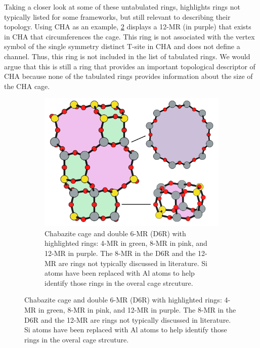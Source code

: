 \documentclass[preprint,numrefs,noinfo,sort&compress]{elsarticle}
\begin{document}
Taking a closer look at some of these untabulated rings, highlights rings not typically listed for some frameworks, but still relevant to describing their topology. Using CHA as an example, \cref{fig:cha-rings} displays a 12-MR (in purple) that exists in CHA that circumferences the cage. This ring is not associated with the vertex symbol of the single symmetry distinct T-site in CHA and does not define a channel. Thus, this ring is not included in the list of tabulated rings. We would argue that this is still a ring that provides an important topological descriptor of CHA because none of the tabulated rings provides information about the size of the CHA cage. 

\begin{figure}
\begin{figure}[H]
\centering
\includegraphics[width=\textwidth]{figures/chapter-3/cha-all-rings.pdf}
\caption{Chabazite cage and double 6-MR (D6R) with highlighted rings: 4-MR in green, 8-MR in pink, and 12-MR in purple. The 8-MR in the D6R and the 12-MR are rings not typically discussed in literature. Si atoms have been replaced with Al atoms to help identify those rings in the overal cage strcuture. \label{fig:cha-rings}}
\end{figure}
\end{figure}
\end{document}
